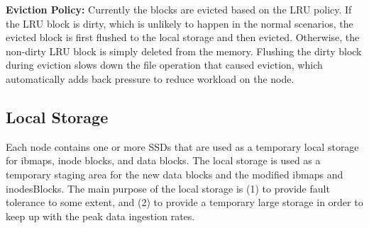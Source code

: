 \documentclass[]{article}
\newcommand{\subtopic}[1]{\vspace{1.5pt} \noindent \textbf{#1}}
\begin{document}
\subtopic{Eviction Policy:} Currently the blocks are evicted based on the LRU
policy.  If the LRU block is dirty, which is unlikely to happen in the normal
scenarios, the evicted block is first flushed to the local storage and then
evicted. Otherwise, the non-dirty LRU block is simply deleted from the memory.
Flushing the dirty block during eviction  slows down the file operation that
caused eviction, which automatically adds back pressure to reduce workload on
the node.


%
%
%


%
%
%
%

\subsection{Local Storage} Each node contains one or more SSDs that are used as
a temporary local storage for ibmaps, inode blocks, and data blocks.  The local
storage is used as a temporary staging area for the new data blocks and the
modified ibmaps and inodesBlocks.  The main purpose of the local storage is
(1) to provide fault tolerance to some extent, and (2) to provide a temporary 
large storage in order to keep up with the peak data ingestion rates.
\end{document}

